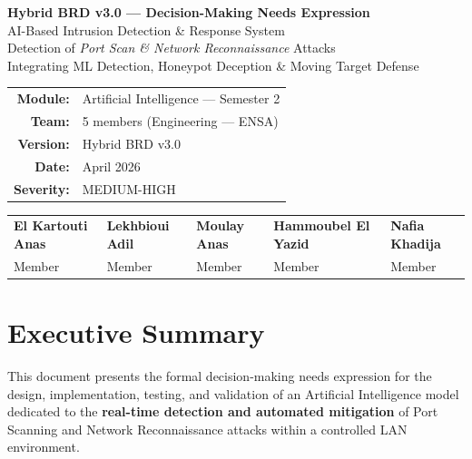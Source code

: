 \documentclass[12pt,a4paper]{article}
\begin{document}
\begin{center}
  {\Large\bfseries Hybrid BRD v3.0 --- Decision-Making Needs Expression}\\[0.6em]
  {\large AI-Based Intrusion Detection \& Response System}\\[0.3em]
  {\large Detection of \textit{Port Scan \& Network Reconnaissance} Attacks}\\[0.3em]
  {\normalsize Integrating ML Detection, Honeypot Deception \& Moving Target Defense}\\[1.2em]
  \begin{tabular}{rl}
    \textbf{Module:}   & Artificial Intelligence --- Semester 2 \\
    \textbf{Team:}     & 5 members (Engineering --- ENSA) \\
    \textbf{Version:}  & Hybrid BRD v3.0 \\
    \textbf{Date:}     & April 2026 \\
    \textbf{Severity:} & MEDIUM-HIGH \\
  \end{tabular}
\end{center}

\vspace{0.5em}

\begin{table}[h!]
\centering
\small
\begin{tabular}{C{3cm} C{3cm} C{3cm} C{3cm} C{3cm}}
  \toprule
  \textbf{El Kartouti Anas} & \textbf{Lekhbioui Adil} & \textbf{Moulay Anas} & \textbf{Hammoubel El Yazid} & \textbf{Nafia Khadija} \\
  Member & Member & Member & Member & Member \\
  \bottomrule
\end{tabular}
\end{table}

\vspace{1em}

\section{Executive Summary}

This document presents the formal decision-making needs expression for the
design, implementation, testing, and validation of an Artificial Intelligence
model dedicated to the \textbf{real-time detection and automated mitigation} of
Port Scanning and Network Reconnaissance attacks within a controlled LAN
environment.
\end{document}
